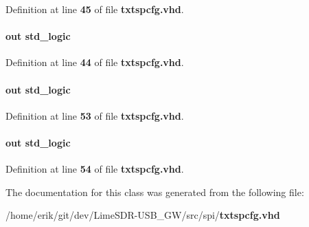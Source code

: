 Definition at line {\bf 45} of file {\bf txtspcfg.\+vhd}.

\paragraph[{stream\+\_\+txen}]{ {\bfseries \textcolor{keywordflow}{out}\textcolor{vhdlchar}{ }} {\bfseries \textcolor{comment}{std\+\_\+logic}\textcolor{vhdlchar}{ }} \hspace{0.3cm}{\ttfamily [Port]}}\label{classtxtspcfg_a17a5928656cb9bd153923f4c66a576d9}


Definition at line {\bf 44} of file {\bf txtspcfg.\+vhd}.

\paragraph[{up\+\_\+dn\+\_\+0}]{ {\bfseries \textcolor{keywordflow}{out}\textcolor{vhdlchar}{ }} {\bfseries \textcolor{comment}{std\+\_\+logic}\textcolor{vhdlchar}{ }} \hspace{0.3cm}{\ttfamily [Port]}}\label{classtxtspcfg_a41ecaff209bd4fde905406a58d670215}


Definition at line {\bf 53} of file {\bf txtspcfg.\+vhd}.

\paragraph[{up\+\_\+dn\+\_\+1}]{ {\bfseries \textcolor{keywordflow}{out}\textcolor{vhdlchar}{ }} {\bfseries \textcolor{comment}{std\+\_\+logic}\textcolor{vhdlchar}{ }} \hspace{0.3cm}{\ttfamily [Port]}}\label{classtxtspcfg_a97f89bbf2d6b55c947bc5ff28f10b0b9}


Definition at line {\bf 54} of file {\bf txtspcfg.\+vhd}.



The documentation for this class was generated from the following file\+:\begin{DoxyCompactItemize}
\item 
/home/erik/git/dev/\+Lime\+S\+D\+R-\/\+U\+S\+B\+\_\+\+G\+W/src/spi/{\bf txtspcfg.\+vhd}\end{DoxyCompactItemize}
